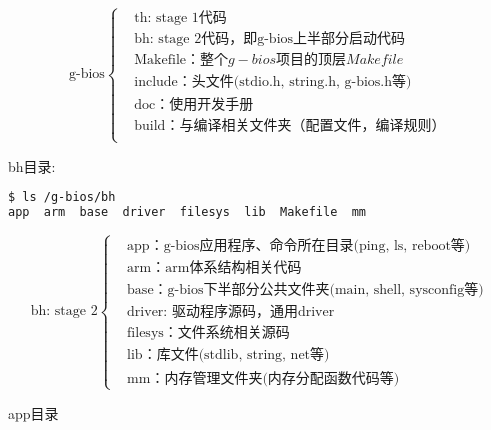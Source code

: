 \begin{equation*}
\text{g-bios}
\left\{
	\begin{aligned}
	&\text{th: stage 1代码} \\
	&\text{bh: stage 2代码，即g-bios上半部分启动代码} \\
	&\text{Makefile：} 整个g-bios项目的顶层Makefile \\
	&\text{include：头文件(stdio.h, string.h, g-bios.h等)} \\
	&\text{doc：使用开发手册} \\
	&\text{build：与编译相关文件夹（配置文件，编译规则）} \\
	\end{aligned}
\right.
\end{equation*}


bh目录:
\begin{lstlisting}[language=bash, numbers=none]
$ ls /g-bios/bh
app  arm  base  driver  filesys  lib  Makefile  mm
\end{lstlisting}

\begin{equation*}
\text{bh: stage 2}
\left\{
	\begin{aligned}
	&\text{app：g-bios应用程序、命令所在目录(ping, ls, reboot等)} \\
	&\text{arm：arm体系结构相关代码} \\
	&\text{base：g-bios下半部分公共文件夹(main, shell, sysconfig等)} \\
	&\text{driver: 驱动程序源码，通用driver} \\
	&\text{filesys：文件系统相关源码} \\
	&\text{lib：库文件(stdlib, string, net等)} \\
	&\text{mm：内存管理文件夹(内存分配函数代码等)}
	\end{aligned}
\right.
\end{equation*}

app目录

